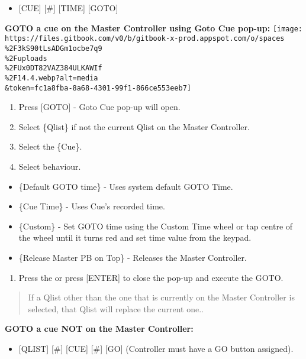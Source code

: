 \documentclass[
]{article}
\providecommand{\tightlist}{%
  \setlength{\itemsep}{0pt}\setlength{\parskip}{0pt}}
\begin{document}
\begin{itemize}
\tightlist
\item
  {[}CUE{]} {[}\#{]} {[}TIME{]} {[}GOTO{]}
\end{itemize}

\textbf{GOTO a cue on the Master Controller using Goto Cue pop-up:}
\texttt{[image: https://files.gitbook.com/v0/b/gitbook-x-prod.appspot.com/o/spaces\\\%2F3kS90tLsADGm1ocbe7q9\\\%2Fuploads\\\%2FUx0DT82VAZ384ULKAWIf\\\%2F14.4.webp?alt=media\\\&token=fc1a8fba-8a68-4301-99f1-866ce553eeb7]}

\begin{enumerate}
\def\labelenumi{\arabic{enumi}.}
\item
  Press {[}GOTO{]} - Goto Cue pop-up will open.
\item
  Select \{Qlist\} if not the current Qlist on the Master Controller.
\item
  Select the \{Cue\}.
\item
  Select behaviour.
\end{enumerate}

\begin{itemize}
\item
  \{Default GOTO time\} - Uses system default GOTO Time.
\item
  \{Cue Time\} - Uses Cue's recorded time.
\item
  \{Custom\} - Set GOTO time using the Custom Time wheel or tap centre of the wheel until it turns red and set time value from the keypad.
\item
  \{Release Master PB on Top\} - Releases the Master Controller.
\end{itemize}

\begin{enumerate}
\def\labelenumi{\arabic{enumi}.}
\tightlist
\item
  Press the \href{image.png}{} or press {[}ENTER{]} to close the pop-up and execute the GOTO.
\end{enumerate}

\begin{quote}
{If a Qlist other than the one that is currently on the Master Controller is selected, that Qlist will replace the current one.}.
\end{quote}

\textbf{GOTO a cue NOT on the Master Controller:}

\begin{itemize}
\tightlist
\item
  {[}QLIST{]} {[}\#{]} {[}CUE{]} {[}\#{]} {[}GO{]} (Controller must have a GO button assigned).
\end{itemize}
\end{document}
